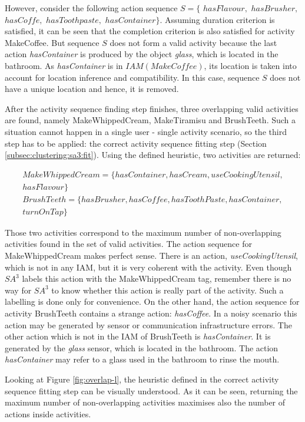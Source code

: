 However, consider the following action sequence $S = \{$ $hasFlavour,$ $hasBrusher,$ $hasCoffe,$ $hasToothpaste,$ $hasContainer\}$. Assuming duration criterion is satisfied, it can be seen that the completion criterion is also satisfied for activity MakeCoffee. But sequence $S$ does not form a valid activity because the last action \textit{hasContainer} is produced by the object \textit{glass}, which is located in the bathroom. As \textit{hasContainer} is in $IAM(MakeCoffee)$, its location is taken into account for location inference and compatibility. In this case, sequence $S$ does not have a unique location and hence, it is removed. 

After the activity sequence finding step finishes, three overlapping valid activities are found, namely MakeWhippedCream, MakeTiramisu and BrushTeeth. Such a situation cannot happen in a single user - single activity scenario, so the third step has to be applied: the correct activity sequence fitting step (Section \ref{subsec:clustering:sa3:fit}). Using the defined heuristic, two activities are returned:

\begin{equation*}
  \begin{split}   
  MakeWhippedCream = \{hasContainer, hasCream, useCookingUtensil,\\ 
  hasFlavour\} \\
  BrushTeeth = \{hasBrusher, hasCoffee, hasToothPaste, hasContainer,\\ 
  turnOnTap\} 
  \end{split}
 \end{equation*} 

Those two activities correspond to the maximum number of non-overlapping activities found in the set of valid activities. The action sequence for MakeWhippedCream makes perfect sense. There is an action, \textit{useCookingUtensil}, which is not in any IAM, but it is very coherent with the activity. Even though $SA^3$ labels this action with the MakeWhippedCream tag, remember there is no way for $SA^3$ to know whether this action is really part of the activity. Such a labelling is done only for convenience. On the other hand, the action sequence for activity BrushTeeth contains a strange action: \textit{hasCoffee}. In a noisy scenario this action may be generated by sensor or communication infrastructure errors. The other action which is not in the IAM of BrushTeeth is \textit{hasContainer}. It is generated by the \textit{glass} sensor, which is located in the bathroom. The action \textit{hasContainer} may refer to a glass used in the bathroom to rinse the mouth. 

Looking at Figure \ref{fig:overlap-l}, the heuristic defined in the correct activity sequence fitting step can be visually understood. As it can be seen, returning the maximum number of non-overlapping activities maximises also the number of actions inside activities.